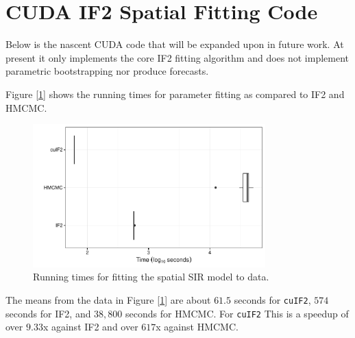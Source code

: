 \section{CUDA IF2 Spatial Fitting Code}

	Below is the nascent CUDA code that will be expanded upon in future work. At present it only implements the core IF2 fitting algorithm and does not implement parametric bootstrapping nor produce forecasts.

	

	Figure [\ref{cudatimeplot2}] shows the running times for parameter fitting as compared to IF2 and HMCMC.

	\begin{figure}[H]
        \centering
        \captionsetup{width=.8\linewidth}
        \includegraphics[width=0.8\textwidth]{./images/timeplot2.pdf}
        \caption{Running times for fitting the spatial SIR model to data. \label{cudatimeplot2}}
    \end{figure}

    The means from the data in Figure [\ref{cudatimeplot2}] are about $61.5$ seconds for \texttt{cuIF2}, $574$ seconds for IF2, and $38,800$ seconds for HMCMC. For \texttt{cuIF2} This is a speedup of over $9.33$x against IF2 and over $617$x against HMCMC.

